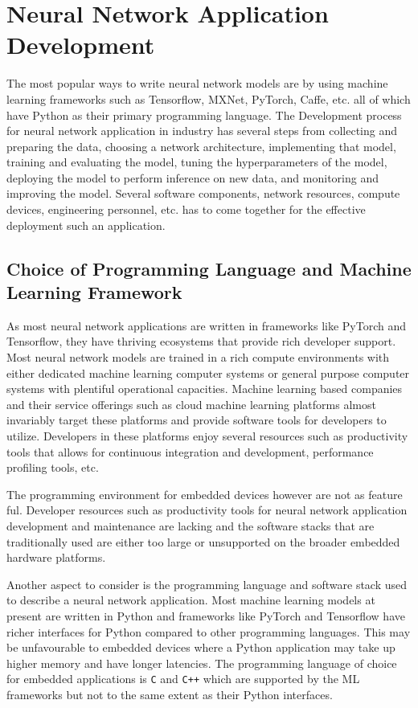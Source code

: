 \section{Neural Network Application Development}

The most popular ways to write neural network models are by using machine learning frameworks such as Tensorflow, MXNet, PyTorch, Caffe, etc. all of which have Python as their primary programming language. The Development process for neural network application in industry has several steps from collecting and preparing the data, choosing a network architecture, implementing that model, training and evaluating the model, tuning the hyperparameters of the model, deploying the model to perform inference on new data, and monitoring and improving the model. Several software components, network resources, compute devices, engineering personnel, etc. has to come together for the effective deployment such an application.

\subsection{Choice of Programming Language and Machine Learning Framework}

As most neural network applications are written in frameworks like PyTorch and Tensorflow, they have thriving ecosystems that provide rich developer support. Most neural network models are trained in a rich compute environments with either dedicated machine learning computer systems or general purpose computer systems with plentiful operational capacities. Machine learning based companies and their service offerings such as cloud machine learning platforms almost invariably target these platforms and provide software tools for developers to utilize. Developers in these platforms enjoy several resources such as productivity tools that allows for continuous integration and development, performance profiling tools, etc.


The programming environment for embedded devices however are not as feature ful. Developer resources such as productivity tools for neural network application development and maintenance are lacking and the software stacks that are traditionally used are either too large or unsupported on the broader embedded hardware platforms.

Another aspect to consider is the programming language and software stack used to describe a neural network application. Most machine learning models at present are written in Python and frameworks like PyTorch and Tensorflow have richer interfaces for Python compared to other programming languages. This may be unfavourable to embedded devices where a Python application may take up higher memory and have longer latencies. The programming language of choice for embedded applications is \texttt{C} and \texttt{C++} which are supported by the ML frameworks but not to the same extent as their Python interfaces.

